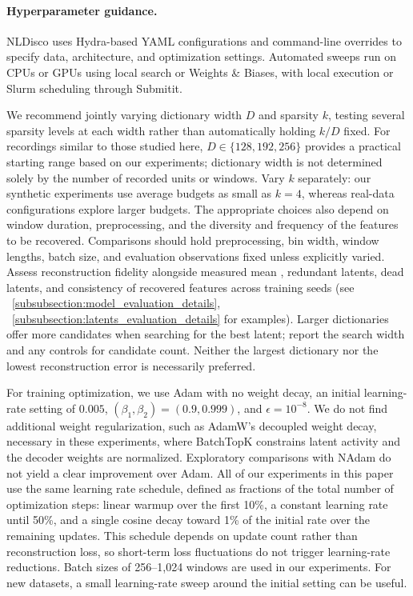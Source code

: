 \paragraph{Hyperparameter guidance.}
\label{paragraph:hyperparameter_sweeps}
\label{subsubsection:hyperparameter_sweeps}
NLDisco uses Hydra-based YAML configurations and command-line overrides to specify data, architecture, and optimization settings. Automated sweeps run on CPUs or GPUs using local search or Weights \& Biases, with local execution or Slurm scheduling through Submitit.

We recommend jointly varying dictionary width $D$ and sparsity $k$, testing several sparsity levels at each width rather than automatically holding $k/D$ fixed. For recordings similar to those studied here, $D\in\{128,192,256\}$ provides a practical starting range based on our experiments; dictionary width is not determined solely by the number of recorded units or windows. Vary $k$ separately: our synthetic experiments use average budgets as small as $k=4$, whereas real-data configurations explore larger budgets. The appropriate choices also depend on window duration, preprocessing, and the diversity and frequency of the features to be recovered. Comparisons should hold preprocessing, bin width, window lengths, batch size, and evaluation observations fixed unless explicitly varied. Assess reconstruction fidelity alongside measured mean , redundant latents, dead latents, and consistency of recovered features across training seeds (see ~\hyperref[subsubsection:model_evaluation_details]{\ref*{subsubsection:model_evaluation_details}}, ~\hyperref[subsubsection:latents_evaluation_details]{\ref*{subsubsection:latents_evaluation_details}} for examples). Larger dictionaries offer more candidates when searching for the best latent; report the search width and any controls for candidate count. Neither the largest dictionary nor the lowest reconstruction error is necessarily preferred.

For training optimization, we use Adam with no weight decay, an initial learning-rate setting of $0.005$, $(\beta_1,\beta_2)=(0.9,0.999)$, and $\epsilon=10^{-8}$. We do not find additional weight regularization, such as AdamW's decoupled weight decay, necessary in these experiments, where BatchTopK constrains latent activity and the decoder weights are normalized. Exploratory comparisons with NAdam do not yield a clear improvement over Adam. All of our experiments in this paper use the same learning rate schedule, defined as fractions of the total number of optimization steps: linear warmup over the first 10\%, a constant learning rate until 50\%, and a single cosine decay toward 1\% of the initial rate over the remaining updates. This schedule depends on update count rather than reconstruction loss, so short-term loss fluctuations do not trigger learning-rate reductions. Batch sizes of 256--1,024 windows are used in our experiments. For new datasets, a small learning-rate sweep around the initial setting can be useful.

